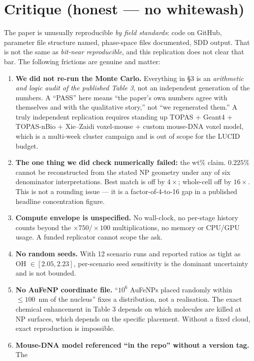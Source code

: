 \documentclass[11pt]{article}
\begin{document}
\section{Critique (honest --- no whitewash)}

The paper is unusually reproducible \emph{by field standards}: code on GitHub, parameter
file structure named, phase-space files documented, SDD output. That is not the same as
\emph{bit-near reproducible}, and this replication does not clear that bar. The following
frictions are genuine and matter:

\begin{enumerate}
\item \textbf{We did not re-run the Monte Carlo.} Everything in \S3 is an
      \emph{arithmetic and logic audit of the published Table 3}, not an independent
      generation of the numbers. A ``PASS'' here means ``the paper's own numbers agree with
      themselves and with the qualitative story,'' not ``we regenerated them.'' A truly
      independent replication requires standing up TOPAS + Geant4 + TOPAS-nBio + Xie--Zaidi
      voxel-mouse + custom mouse-DNA voxel model, which is a multi-week cluster campaign
      and is out of scope for the LUCID budget.
\item \textbf{The one thing we did check numerically failed:} the wt\% claim.
      $0.225$\% cannot be reconstructed from the stated NP geometry under any of six
      denominator interpretations. Best match is off by $4\times$; whole-cell off by
      $16\times$. This is not a rounding issue --- it is a factor-of-4-to-16 gap in a
      published headline concentration figure.
\item \textbf{Compute envelope is unspecified.} No wall-clock, no per-stage history counts
      beyond the $\times 750 / \times 100$ multiplications, no memory or CPU/GPU usage.
      A funded replicator cannot scope the ask.
\item \textbf{No random seeds.} With 12 scenario runs and reported ratios as tight as
      OH $\in [2.05, 2.23]$, per-scenario seed sensitivity is the dominant uncertainty
      and is not bounded.
\item \textbf{No AuFeNP coordinate file.} ``$10^6$ AuFeNPs placed randomly within
      $\leq 100$~nm of the nucleus'' fixes a distribution, not a realisation. The exact
      chemical enhancement in Table 3 depends on which molecules are killed at NP surfaces,
      which depends on the specific placement. Without a fixed cloud, exact reproduction
      is impossible.
\item \textbf{Mouse-DNA model referenced ``in the repo'' without a version tag.} The

\end{enumerate}
\end{document}
